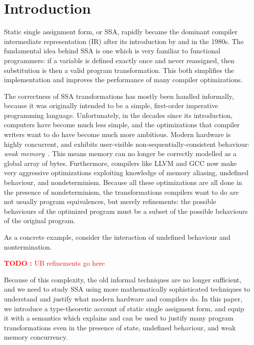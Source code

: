 \documentclass[acmsmall,screen,review]{acmart}
\newcounter{todos}
\newcommand{\TODO}[1]{{
  \stepcounter{todos}
  \begin{center}\large{\textcolor{red}{\textbf{TODO \arabic{todos}:} #1}}\end{center}
}}
\begin{document}
\maketitle

\section{Introduction}

Static single assignment form, or SSA, rapidly became the dominant compiler intermediate
representation (IR) after its introduction by \citet{alpern-ssa-original-88} and
\citet{rosen-gvn-1988} in the 1980s. The fundamental idea behind SSA is one which is very familiar
to functional programmers: if a variable is defined exactly once and never reassigned, then
substitution is then a valid program transformation. This both simplifies the implementation and
improves the performance of many compiler optimizations.

The correctness of SSA transformations has mostly been handled informally, because it was originally
intended to be a simple, first-order imperative programming language. Unfortunately, in the decades
since its introduction, computers have become much less simple, and the optimizations that compiler
writers want to do have become much more ambitious. Modern hardware is highly concurrent, and
exhibits user-visible non-sequentially-consistent behaviour: \emph{weak
memory}~\cite{batty-compositional-17}. This means memory can no longer be correctly modelled as a
global array of bytes. Furthermore, compilers like LLVM and GCC now make very aggressive
optimizations exploiting knowledge of memory aliasing, undefined behaviour, and nondeterminism.
Because all these optimizations are all done in the presence of nondeterminism, the transformations
compilers want to do are not usually program equivalences, but merely refinements: the possible
behaviours of the optimized program must be a subset of the possible behaviours of the original
program.

As a concrete example, consider the interaction of undefined behaviour and nontermination. 

\TODO{UB refinements go here}

Because of this complexity, the old informal techniques are no longer sufficient, and we need to
study SSA using more mathematically sophisticated techniques to understand and justify what modern
hardware and compilers do. In this paper, we introduce a type-theoretic account of static single
assigment form, and equip it with a semantics which explains and can be used to justify many program
transformations even in the presence of state, undefined behaviour, and weak memory concurrency. 
\end{document}
